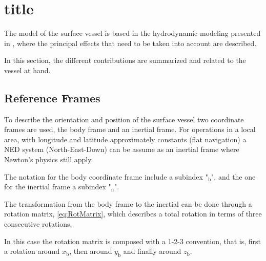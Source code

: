 \section{title}
The model of the surface vessel is based in the hydrodynamic modeling presented in \cite{TFossen}, where the principal effects that need to be taken into account are described.

In this section, the different contributions are summarized and related to the vessel at hand.

\subsection{Reference Frames}
To describe the orientation and position of the surface vessel two coordinate frames are used, the body frame and an inertial frame. For operations in a local area, with longitude and latitude approximately constants (flat navigation) a NED system (North-East-Down) can be assume as an inertial frame where Newton's physics still apply.

The notation for the body coordinate frame include a subindex "$_\mathrm{b}$", and the one for the inertial frame a subindex "$_\mathrm{n}$".

The transformation from the body frame to the inertial can be done through a rotation matrix, \eqref{eq:RotMatrix}, which describes a total rotation in terms of three consecutive rotations.

In this case the rotation matrix is composed with a 1-2-3 convention, that is, first a rotation around $x_{\mathrm{b}}$, then around $y_{\mathrm{b}}$ and finally around $z_{\mathrm{b}}$.


